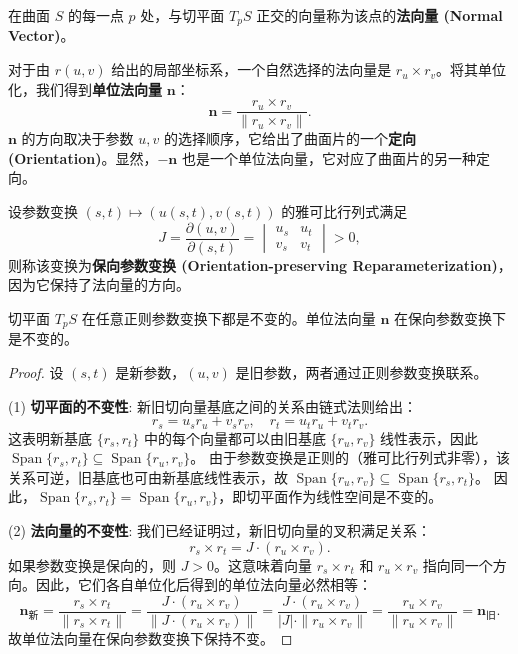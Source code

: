 \documentclass[lang=cn,10pt,thmcnt=section]{elegantbook}
\begin{document}
\begin{definition}[法向量与曲面定向]
    在曲面 $S$ 的每一点 $p$ 处，与切平面 $T_p S$ 正交的向量称为该点的\textbf{法向量 (Normal Vector)}。
    
    对于由 $r(u,v)$ 给出的局部坐标系，一个自然选择的法向量是 $r_u \times r_v$。将其单位化，我们得到\textbf{单位法向量} $\mathbf{n}$：
    \[
    \mathbf{n} = \frac{r_u \times r_v}{\| r_u \times r_v \|}.
    \]
    $\mathbf{n}$ 的方向取决于参数 $u, v$ 的选择顺序，它给出了曲面片的一个\textbf{定向 (Orientation)}。显然，$-\mathbf{n}$ 也是一个单位法向量，它对应了曲面片的另一种定向。
\end{definition}
\begin{remark}
    设参数变换 $(s,t) \mapsto (u(s,t), v(s,t))$ 的雅可比行列式满足
    \[
    J = \frac{\partial (u,v)}{\partial (s,t)} = \begin{vmatrix} u_s & u_t \\ v_s & v_t \end{vmatrix} > 0,
    \]
    则称该变换为\textbf{保向参数变换 (Orientation-preserving Reparameterization)}，因为它保持了法向量的方向。
\end{remark}

\begin{proposition}
    切平面 $T_p S$ 在任意正则参数变换下都是不变的。单位法向量 $\mathbf{n}$ 在保向参数变换下是不变的。
\end{proposition}
\begin{proof}
    设 $(s,t)$ 是新参数，$(u,v)$ 是旧参数，两者通过正则参数变换联系。
    
    \noindent (1) \textbf{切平面的不变性}:
    新旧切向量基底之间的关系由链式法则给出：
    \[
    r_s = u_s r_u + v_s r_v, \quad r_t = u_t r_u + v_t r_v.
    \]
    这表明新基底 $\{r_s, r_t\}$ 中的每个向量都可以由旧基底 $\{r_u, r_v\}$ 线性表示，因此 $\operatorname{Span}\{r_s, r_t\} \subseteq \operatorname{Span}\{r_u, r_v\}$。
    由于参数变换是正则的（雅可比行列式非零），该关系可逆，旧基底也可由新基底线性表示，故 $\operatorname{Span}\{r_u, r_v\} \subseteq \operatorname{Span}\{r_s, r_t\}$。
    因此，$\operatorname{Span}\{r_s, r_t\} = \operatorname{Span}\{r_u, r_v\}$，即切平面作为线性空间是不变的。
    
    \noindent (2) \textbf{法向量的不变性}:
    我们已经证明过，新旧切向量的叉积满足关系：
    \[
    r_s \times r_t = J \cdot (r_u \times r_v).
    \]
    如果参数变换是保向的，则 $J>0$。这意味着向量 $r_s \times r_t$ 和 $r_u \times r_v$ 指向同一个方向。因此，它们各自单位化后得到的单位法向量必然相等：
    \[
    \mathbf{n}_{\text{新}} = \frac{r_s \times r_t}{\| r_s \times r_t \|} = \frac{J \cdot (r_u \times r_v)}{\| J \cdot (r_u \times r_v) \|} = \frac{J \cdot (r_u \times r_v)}{|J| \cdot \| r_u \times r_v \|} = \frac{r_u \times r_v}{\| r_u \times r_v \|} = \mathbf{n}_{\text{旧}}.
    \]
    故单位法向量在保向参数变换下保持不变。
\end{proof}
\end{document}
